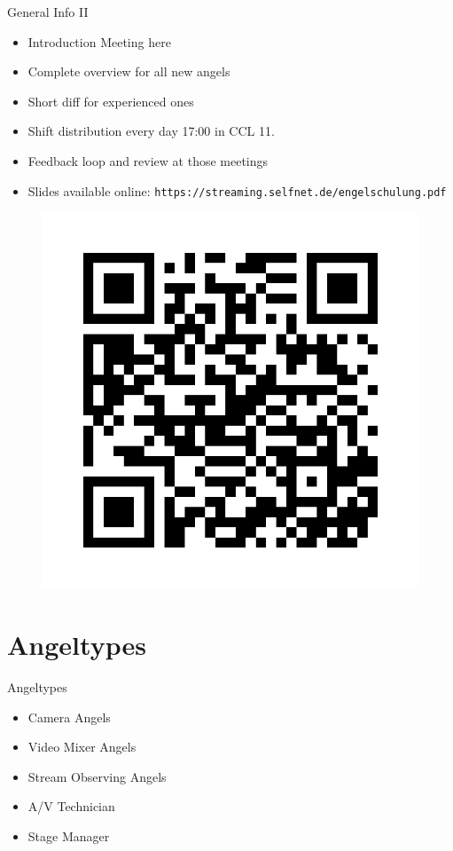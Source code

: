 \documentclass[aspectratio=169]{beamer}
\begin{document}
\begin{frame}{General Info II}
	\begin{itemize}
		\item Introduction Meeting here
		\item Complete overview for all new angels
		\item Short diff for experienced ones
		\item Shift distribution every day 17:00 in CCL 11.
		\item Feedback loop and review at those meetings
		\item Slides available online: \texttt{https://streaming.selfnet.de/engelschulung.pdf}
	\end{itemize}
	\begin{figure} 
		\centering
		\includegraphics[height=0.4\textheight]{images/qrcode.png}
	\end{figure}
\end{frame}

\section{Angeltypes}
\begin{frame}{Angeltypes}
	\begin{itemize}
		\item Camera Angels
		\item Video Mixer Angels
		\item Stream Observing Angels
		\item A/V Technician
		\item Stage Manager
	\end{itemize}
\end{frame}
\end{document}
